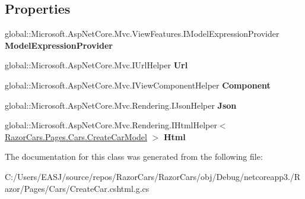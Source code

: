 \subsection*{Properties}
\begin{DoxyCompactItemize}
\item 
\mbox{\label{class_razor_cars_1_1_pages_1_1_cars_1_1_pages___cars___create_car_ae2a34063e4b14638af5877572850dbab}} 
global\+::\+Microsoft.\+Asp\+Net\+Core.\+Mvc.\+View\+Features.\+I\+Model\+Expression\+Provider {\bfseries Model\+Expression\+Provider}
\item 
\mbox{\label{class_razor_cars_1_1_pages_1_1_cars_1_1_pages___cars___create_car_aa645fea24366b9c13bbeff7dc50f356d}} 
global\+::\+Microsoft.\+Asp\+Net\+Core.\+Mvc.\+I\+Url\+Helper {\bfseries Url}
\item 
\mbox{\label{class_razor_cars_1_1_pages_1_1_cars_1_1_pages___cars___create_car_a976ee7e0c3c54358f8f91d916ba6de88}} 
global\+::\+Microsoft.\+Asp\+Net\+Core.\+Mvc.\+I\+View\+Component\+Helper {\bfseries Component}
\item 
\mbox{\label{class_razor_cars_1_1_pages_1_1_cars_1_1_pages___cars___create_car_ae53696daf8db2bd5af431bb414d7b9e9}} 
global\+::\+Microsoft.\+Asp\+Net\+Core.\+Mvc.\+Rendering.\+I\+Json\+Helper {\bfseries Json}
\item 
\mbox{\label{class_razor_cars_1_1_pages_1_1_cars_1_1_pages___cars___create_car_aa8c7571ea81f721b88a6a6316cec9a3e}} 
global\+::\+Microsoft.\+Asp\+Net\+Core.\+Mvc.\+Rendering.\+I\+Html\+Helper$<$ \mbox{\hyperlink{class_razor_cars_1_1_pages_1_1_cars_1_1_create_car_model}{Razor\+Cars.\+Pages.\+Cars.\+Create\+Car\+Model}} $>$ {\bfseries Html}
\end{DoxyCompactItemize}


The documentation for this class was generated from the following file\+:\begin{DoxyCompactItemize}
\item 
C\+:/\+Users/\+E\+A\+S\+J/source/repos/\+Razor\+Cars/\+Razor\+Cars/obj/\+Debug/netcoreapp3./\+Razor/\+Pages/\+Cars/Create\+Car.\+cshtml.\+g.\+cs\end{DoxyCompactItemize}
